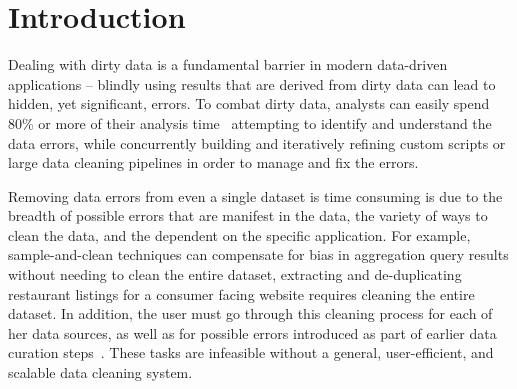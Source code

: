 \section{Introduction}\label{sec:intro}



%
%
Dealing with dirty data is a fundamental barrier in modern data-driven applications -- 
blindly using results that are derived from dirty data can lead to hidden, yet significant, errors.
To combat dirty data, analysts can easily spend 80\% or more of their analysis 
time~\cite{kandel2012} attempting to identify and understand the data errors, 
while concurrently building and iteratively refining custom scripts or large data cleaning pipelines 
in order to manage and fix the errors.  

Removing data errors from even a single dataset is 
time consuming is due to the breadth of possible errors that are manifest in the data,
the variety of ways to clean the data, and the dependent on the specific application.
For example, sample-and-clean techniques can compensate for bias in aggregation query 
results without needing to clean the entire dataset, extracting and de-duplicating
restaurant listings for a consumer facing website requires cleaning the entire dataset.
In addition, the user must go through this cleaning process for each of her data sources, as well as
for possible errors introduced as part of earlier data curation steps~\cite{}.
These tasks are infeasible without a general, user-efficient, and scalable data cleaning system.





